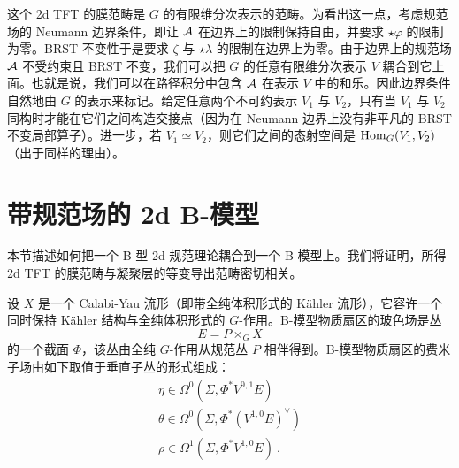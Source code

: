 
这个 2d TFT 的膜范畴是 $G$ 的有限维分次表示的范畴。为看出这一点，考虑规范场的 Neumann 边界条件，即让 $\mathcal{A}$ 在边界上的限制保持自由，并要求 $\star\varphi$ 的限制为零。BRST 不变性于是要求 $\zeta$ 与 $\star\lambda$ 的限制在边界上为零。由于边界上的规范场 $\mathcal{A}$ 不受约束且 BRST 不变，我们可以把 $G$ 的任意有限维分次表示 $V$ 耦合到它上面。也就是说，我们可以在路径积分中包含 $\mathcal{A}$
在表示 $V$ 中的和乐。因此边界条件自然地由 $G$ 的表示来标记。给定任意两个不可约表示 $V_1$ 与 $V_2$，只有当 $V_1$ 与 $V_2$ 同构时才能在它们之间构造交接点（因为在 Neumann 边界上没有非平凡的 BRST 不变局部算子）。进一步，若 $V_1\simeq V_2$，则它们之间的态射空间是 $\operatorname{Hom}_G(V_1,V_2)$（出于同样的理由）。


\section{带规范场的 2d B-模型}

本节描述如何把一个 B-型 2d 规范理论耦合到一个 B-模型上。我们将证明，所得 2d TFT 的膜范畴与凝聚层的等变导出范畴密切相关。

设 $X$ 是一个 Calabi-Yau 流形（即带全纯体积形式的 Kähler 流形），它容许一个同时保持 Kähler 结构与全纯体积形式的 $G$-作用。B-模型物质扇区的玻色场是丛
\[ E = P\times_G X \]
的一个截面 $\Phi$，该丛由全纯 $G$-作用从规范丛 $P$ 相伴得到。B-模型物质扇区的费米子场由如下取值于垂直子丛的形式组成：
\begin{gather*}
\eta \in \Omega^0(\Sigma, \Phi^*V^{0,1}E) \\
\theta \in \Omega^0(\Sigma, \Phi^*(V^{1,0}E)^\vee) \\
\rho \in \Omega^1(\Sigma, \Phi^*V^{1,0}E) \ .
\end{gather*}


